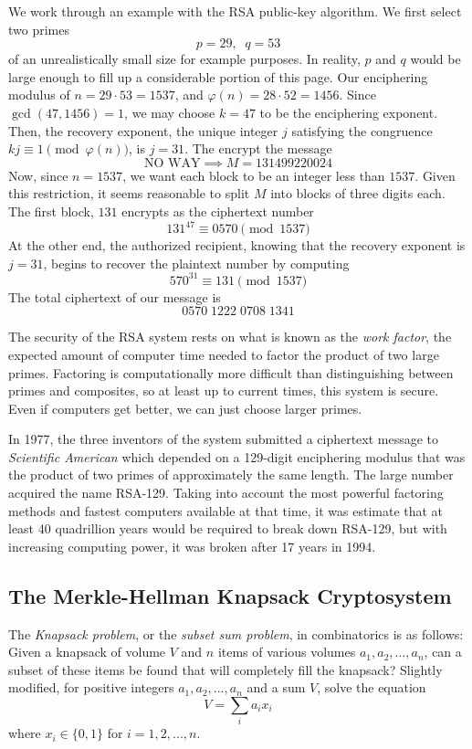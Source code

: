 \documentclass{article}
\theoremstyle{remark}
\theoremstyle{definition}
\begin{document}
We work through an example with the RSA public-key algorithm. We first select two primes 
\[p = 29, \;\; q = 53\]
of an unrealistically small size for example purposes. In reality, $p$ and $q$ would be large enough to fill up a considerable portion of this page. Our enciphering modulus of $n = 29 \cdot 53 = 1537$, and $\varphi(n) = 28 \cdot 52 = 1456$. Since $\gcd(47, 1456) = 1$, we may choose $k = 47$ to be the enciphering exponent. Then, the recovery exponent, the unique integer $j$ satisfying the congruence $kj \equiv 1 \pmod{\varphi(n)}$, is $j = 31$. The encrypt the message 
\[\text{NO WAY} \implies M = 131499220024\]
Now, since $n = 1537$, we want each block to be an integer less than $1537$. Given this restriction, it seems reasonable to split $M$ into blocks of three digits each. The first block, $131$ encrypts as the ciphertext number 
\[131^{47} \equiv 0570 \pmod{1537}\]
At the other end, the authorized recipient, knowing that the recovery exponent is $j = 31$, begins to recover the plaintext number by computing 
\[570^{31} \equiv 131 \pmod{1537}\]
The total ciphertext of our message is 
\[0570 \; 1222 \; 0708 \; 1341\]

The security of the RSA system rests on what is known as the \textit{work factor}, the expected amount of computer time needed to factor the product of two large primes. Factoring is computationally more difficult than distinguishing between primes and composites, so at least up to current times, this system is secure. Even if computers get better, we can just choose larger primes. 

In 1977, the three inventors of the system submitted a ciphertext message to \textit{Scientific American} which depended on a 129-digit enciphering modulus that was the product of two primes of approximately the same length. The large number acquired the name RSA-129. Taking into account the most powerful factoring methods and fastest computers available at that time, it was estimate that at least 40 quadrillion years would be required to break down RSA-129, but with increasing computing power, it was broken after 17 years in 1994. 

\subsection{The Merkle-Hellman Knapsack Cryptosystem}
The \textit{Knapsack problem}, or the \textit{subset sum problem}, in combinatorics is as follows: Given a knapsack of volume $V$ and $n$ items of various volumes $a_1, a_2, ..., a_n$, can a subset of these items be found that will completely fill the knapsack? Slightly modified, for positive integers $a_1, a_2, ..., a_n$ and a sum $V$, solve the equation
\[V = \sum_{i} a_i x_i\]
where $x_i \in \{0, 1\}$ for $i = 1, 2, ..., n$. 
\end{document}
